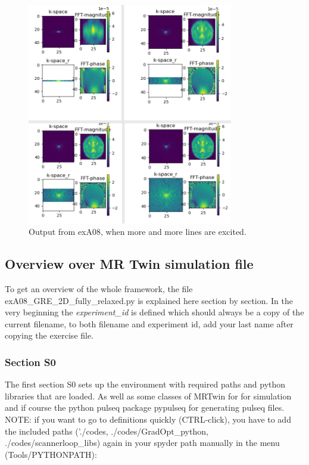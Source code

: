 \documentclass[a4paper,12pt]{extarticle}
\begin{document}
\begin{figure}[!ht] 
\centering
\includegraphics[width=9cm]{img/exA08_2.PNG}
\caption{Output from exA08, when more and more lines are excited.} \label{fig:exA09_2}
\end{figure}

\newpage 

\subsection{Overview over MR Twin simulation file}

To get an overview of the whole framework, the file exA08\_GRE\_2D\_fully\_relaxed.py is explained here section by section. In the very beginning the \emph{experiment\_id} is defined which should always be a copy of the current filename, to both filename and experiment id, add your last name after copying the exercise file. 

\subsubsection{Section S0}
The first section S0 sets up the environment with required paths and python libraries that are loaded. As well as some classes of MRTwin for for simulation and if course the python pulseq package pypulseq for generating pulseq files.
NOTE: if you want to go to definitions quickly (CTRL-click), you have to add the included paths ('./codes, ./codes/GradOpt\_python, ./codes/scannerloop\_libs)  again in your spyder path manually in the menu (Tools/PYTHONPATH):
\end{document}
